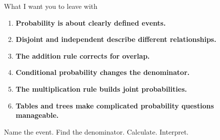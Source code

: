 \documentclass[11pt,aspectratio=169]{beamer}
\begin{document}
\begin{frame}{What I want you to leave with}
\begin{enumerate}
  \item \textbf{Probability is about clearly defined events.}
  \item \textbf{Disjoint and independent describe different relationships.}
  \item \textbf{The addition rule corrects for overlap.}
  \item \textbf{Conditional probability changes the denominator.}
  \item \textbf{The multiplication rule builds joint probabilities.}
  \item \textbf{Tables and trees make complicated probability questions manageable.}
\end{enumerate}

\vfill
\begin{center}
\Large \alert{Name the event. Find the denominator. Calculate. Interpret.}
\end{center}
\end{frame}
\end{document}
